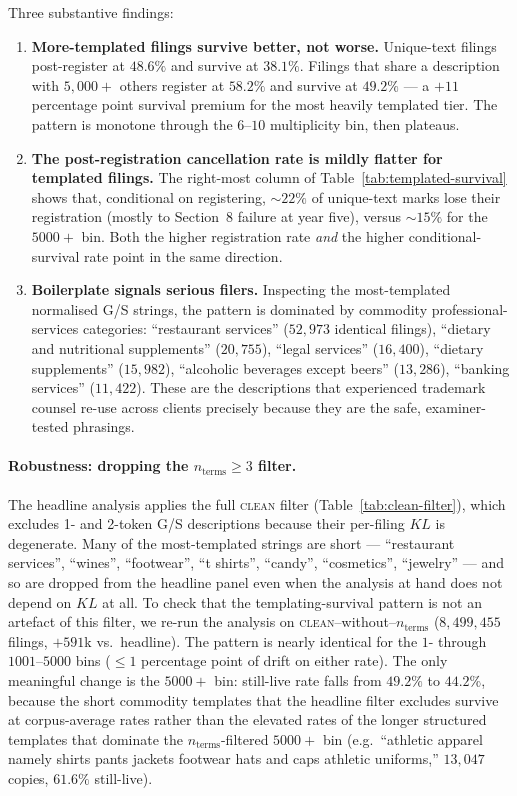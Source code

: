\documentclass[11pt]{article}
\begin{document}
Three substantive findings:

\begin{enumerate}
  \item \textbf{More-templated filings survive better, not worse.}
    Unique-text filings post-register at $48.6\%$ and survive at
    $38.1\%$. Filings that share a description with $5{,}000+$ others
    register at $58.2\%$ and survive at $49.2\%$ --- a $+11$ percentage
    point survival premium for the most heavily templated tier. The
    pattern is monotone through the $6$--$10$ multiplicity bin, then
    plateaus.
  \item \textbf{The post-registration cancellation rate is mildly
    flatter for templated filings.} The right-most column of
    Table~\ref{tab:templated-survival} shows that, conditional on
    registering, $\sim\!22\%$ of unique-text marks lose their
    registration (mostly to Section~8 failure at year five), versus
    $\sim\!15\%$ for the $5000+$ bin. Both the higher registration
    rate \emph{and} the higher conditional-survival rate point in the
    same direction.
  \item \textbf{Boilerplate signals serious filers.} Inspecting the
    most-templated normalised G/S strings, the pattern is dominated by
    commodity professional-services categories: ``restaurant
    services'' ($52{,}973$ identical filings), ``dietary and
    nutritional supplements'' ($20{,}755$), ``legal services''
    ($16{,}400$), ``dietary supplements'' ($15{,}982$), ``alcoholic
    beverages except beers'' ($13{,}286$), ``banking services''
    ($11{,}422$). These are the descriptions that experienced
    trademark counsel re-use across clients precisely because they are
    the safe, examiner-tested phrasings.
\end{enumerate}

\paragraph{Robustness: dropping the $n_{\text{terms}} \geq 3$ filter.}
The headline analysis applies the full \textsc{clean} filter
(Table~\ref{tab:clean-filter}), which excludes 1- and 2-token G/S
descriptions because their per-filing $KL$ is degenerate. Many of the
most-templated strings are short --- ``restaurant services'',
``wines'', ``footwear'', ``t shirts'', ``candy'', ``cosmetics'',
``jewelry'' --- and so are dropped from the headline panel even when
the analysis at hand does not depend on $KL$ at all. To check that
the templating-survival pattern is not an artefact of this filter, we
re-run the analysis on \textsc{clean}--without--$n_{\text{terms}}$
($8{,}499{,}455$ filings, $+591$k vs.\ headline). The pattern is
nearly identical for the $1$- through $1001$--$5000$ bins ($\leq 1$
percentage point of drift on either rate). The only meaningful change
is the $5000+$ bin: still-live rate falls from $49.2\%$ to $44.2\%$,
because the short commodity templates that the headline filter
excludes survive at corpus-average rates rather than the elevated
rates of the longer structured templates that dominate the
$n_{\text{terms}}$-filtered $5000+$ bin (e.g.\ ``athletic apparel
namely shirts pants jackets footwear hats and caps athletic
uniforms,'' $13{,}047$ copies, $61.6\%$ still-live).
\end{document}
